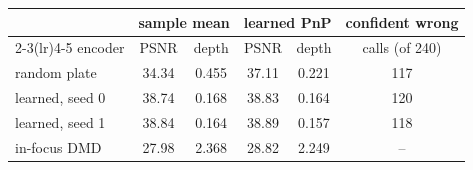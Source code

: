 \begin{tabular}{@{}l cc cc c@{}}\toprule
 & \multicolumn{2}{c}{sample mean} & \multicolumn{2}{c}{learned PnP} & confident wrong\\
\cmidrule(lr){2-3}\cmidrule(lr){4-5}
encoder & PSNR & depth & PSNR & depth & calls (of 240)\\\midrule
random plate & 34.34 & 0.455 & 37.11 & 0.221 & 117\\
learned, seed 0 & 38.74 & 0.168 & 38.83 & 0.164 & 120\\
learned, seed 1 & 38.84 & 0.164 & 38.89 & 0.157 & 118\\
in-focus DMD & 27.98 & 2.368 & 28.82 & 2.249 & --\\
\bottomrule\end{tabular}

